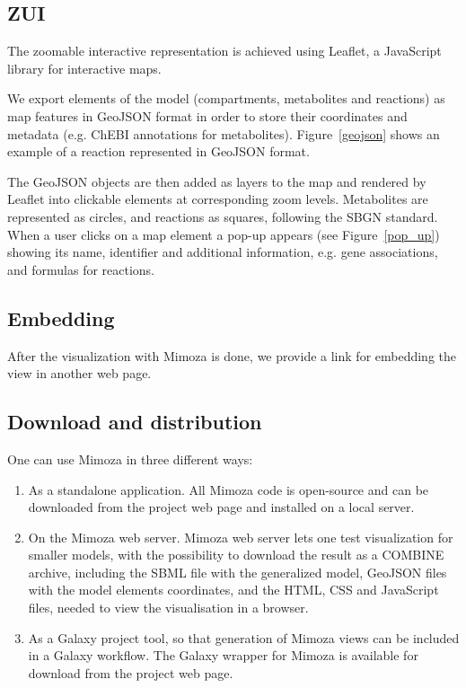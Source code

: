 \documentclass{bmcart}
\begin{document}
\subsection*{ZUI}

The zoomable interactive representation is achieved using Leaflet\cite{Agafonkin}, a JavaScript library for interactive maps. 

We export elements of the model (compartments, metabolites and reactions) as map features in GeoJSON format\cite{Butler} in order to store their coordinates and metadata (e.g. ChEBI annotations for metabolites). Figure~\ref{geojson} shows an example of a reaction represented in GeoJSON format. 

The GeoJSON objects are then added as layers to the map and rendered by Leaflet into clickable elements at corresponding zoom levels. Metabolites are represented as circles, and reactions as squares, following the SBGN standard\cite{Moodie2011}.  When a user clicks on a map element a pop-up appears (see Figure~\ref{pop_up}) showing its name, identifier and additional information, e.g. gene associations, and formulas for reactions.
 

\subsection*{Embedding}
After the visualization with Mimoza is done, we provide a link for embedding the view in another web page.

\subsection*{Download and distribution}

One can use Mimoza in three different ways:
\begin{enumerate}
\item As a standalone application.
All Mimoza code is open-source and can be downloaded from the project web page\cite{Zhukovaa} and installed on a local server.
\item On the Mimoza web server.
Mimoza web server\cite{Zhukovaa} lets one test visualization for smaller models, with the possibility to download the result as a COMBINE archive\cite{LeNovere}, including the SBML file with the generalized model, GeoJSON files with the model elements coordinates, and the HTML, CSS and JavaScript files, needed to view the visualisation in a browser.
\item As a Galaxy\cite{Blankenberg2010} project tool, so that generation of Mimoza views can be included in a Galaxy workflow.
The Galaxy wrapper for Mimoza is available for download from the project web page.
\end{enumerate}
\end{document}
